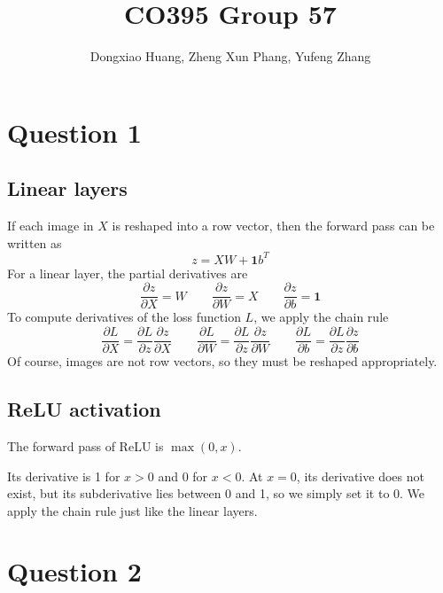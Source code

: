 \documentclass[12pt, a4paper]{article}
\title{\vspace{-6ex} CO395 Group 57 \vspace{-1ex}}
\author{Dongxiao Huang, Zheng Xun Phang, Yufeng Zhang}
\date{\vspace{-3ex}}
\begin{document}
\maketitle
\newcommand\ones{\bm{1}}

\section*{Question 1}

\subsection*{Linear layers}
If each image in $X$ is reshaped into a row vector, then the forward pass can be written as
\[ z = XW + \ones b^T \]
For a linear layer, the partial derivatives are
\[ \frac{\partial z}{\partial X} = W \qquad \frac{\partial z}{\partial W} = X \qquad \frac{\partial z}{\partial b} = \ones \]
To compute derivatives of the loss function $L$, we apply the chain rule
\[ \frac{\partial L}{\partial X} = \frac{\partial L}{\partial z} \frac{\partial z}{\partial X} \qquad \frac{\partial L}{\partial W} = \frac{\partial L}{\partial z} \frac{\partial z}{\partial W} \qquad \frac{\partial L}{\partial b} = \frac{\partial L}{\partial z} \frac{\partial z}{\partial b} \]
Of course, images are not row vectors, so they must be reshaped appropriately.

\subsection*{ReLU activation}
The forward pass of ReLU is $\max(0, x)$.\par
\bigskip
Its derivative is 1 for $x > 0$ and 0 for $x < 0$. At $x = 0$, its derivative does not exist, but its subderivative  lies between 0 and 1, so we simply set it to 0. We apply the chain rule just like the linear layers.

\section*{Question 2}
\end{document}
